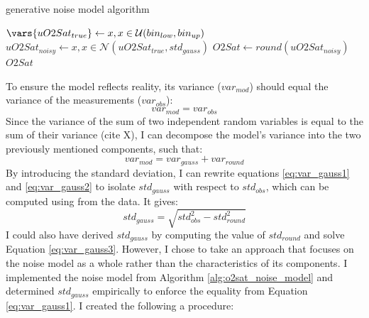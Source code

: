 \begin{algorithm}
\caption{\OXSat generative noise model algorithm}\label{alg:o2sat_noise_model}
\begin{algorithmic}[1]
      \State $\vars{uO2Sat_{true}} \gets x, x \in \mathcal{U}(bin_{low}, bin_{up})$
      \State $uO2Sat_{noisy} \gets x, x \in \mathcal{N}(uO2Sat_{true}, std_{gauss})$
      \State $O2Sat \gets round(uO2Sat_{noisy})$ \\
      \Return $O2Sat$
    \EndFunction
\end{algorithmic}
\end{algorithm}

To ensure the model reflects reality, its variance ($var_{mod}$) should equal the variance of the \OXSat measurements ($var_{obs}$):
\begin{equation} \label{eq:var_gauss1}
    var_{mod} = var_{obs}
\end{equation}
Since the variance of the sum of two independent random variables is equal to the sum of their variance (cite X), I can decompose the model's variance into the two previously mentioned components, such that:
\begin{equation} \label{eq:var_gauss2}
    var_{mod} = var_{gauss} + var_{round}
\end{equation}
By introducing the standard deviation, I can rewrite equations \ref{eq:var_gauss1} and \ref{eq:var_gauss2} to isolate $std_{gauss}$ with respect to $std_{obs}$, which can be computed using from the data. It gives:
\begin{equation} \label{eq:var_gauss3}
    std_{gauss} = \sqrt{std_{obs}^2 - std_{round}^2}
\end{equation}
I could also have derived $std_{gauss}$ by computing the value of $std_{round}$ and solve Equation \ref{eq:var_gauss3}. However, I chose to take an approach that focuses on the noise model as a whole rather than the characteristics of its components. I implemented the noise model from Algorithm \ref{alg:o2sat_noise_model} and determined $std_{gauss}$ empirically to enforce the equality from Equation \ref{eq:var_gauss1}. I created the following a procedure:
